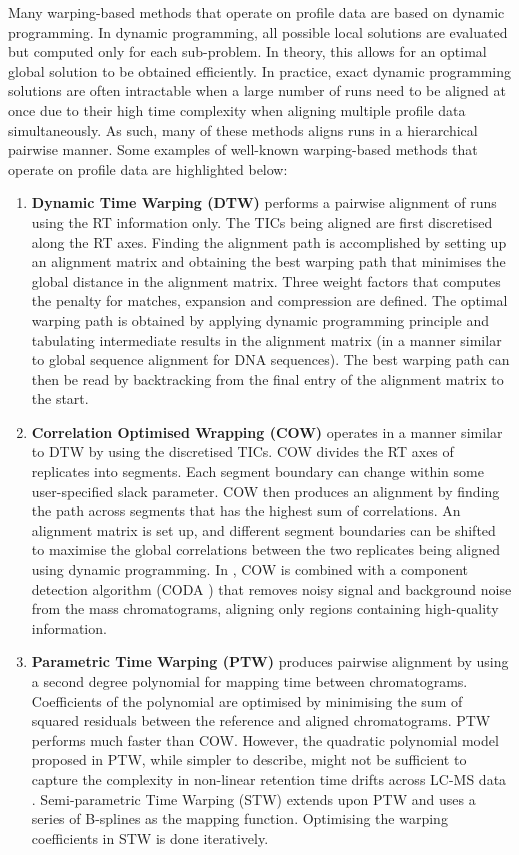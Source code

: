 Many warping-based methods that operate on profile data are based on dynamic programming. In dynamic programming, all possible local solutions are evaluated but computed only for each sub-problem. In theory, this allows for an optimal global solution to be obtained efficiently. In practice, exact dynamic programming solutions are often intractable when a large number of runs need to be aligned at once due to their high time complexity when aligning multiple profile data simultaneously. As such, many of these methods aligns runs in a hierarchical pairwise manner. Some examples of well-known warping-based methods that operate on profile data are highlighted below: 

\begin{enumerate}
\item \textbf{Dynamic Time Warping (DTW)} \cite{Sakoe1978} performs a pairwise alignment of runs using the RT information only. The TICs being aligned are first discretised along the RT axes. Finding the alignment path is accomplished by setting up an alignment matrix and obtaining the best warping path that minimises the global distance in the alignment matrix. Three weight factors that computes the penalty for matches, expansion and compression are defined. The optimal warping path is obtained by applying dynamic programming principle and tabulating intermediate results in the alignment matrix (in a manner similar to global sequence alignment for DNA sequences). The best warping path can then be read by backtracking from the final entry of the alignment matrix to the start. 
\item \textbf{Correlation Optimised Wrapping (COW)} \cite{Nielsen1998} operates in a manner similar to DTW by using the discretised TICs. COW divides the RT axes of replicates into segments. Each segment boundary can change within some user-specified slack parameter. COW then produces an alignment by finding the path across segments that has the highest sum of correlations. An alignment matrix is set up, and different segment boundaries can be shifted to maximise the global correlations between the two replicates being aligned using dynamic programming. In \cite{Christin2008}, COW is combined with a component detection algorithm (CODA \cite{Windig2007}) that removes noisy signal and background noise from the mass chromatograms, aligning only regions containing high-quality information.
\item \textbf{Parametric Time Warping (PTW)} \cite{VanNederkassel2006} produces pairwise alignment by using a second degree polynomial for mapping time between chromatograms. Coefficients of the polynomial are optimised by minimising the sum of squared residuals between the reference and aligned chromatograms. PTW performs much faster than COW. However, the quadratic polynomial model proposed in PTW, while simpler to describe, might not be sufficient to capture the complexity in non-linear retention time drifts across LC-MS data \cite{podwojski2009retention}. Semi-parametric Time Warping (STW) extends upon PTW and uses a series of B-splines as the mapping function. Optimising the warping coefficients in STW is done iteratively.

\end{enumerate}
